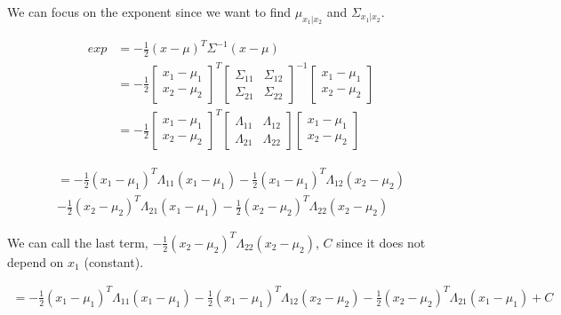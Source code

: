\documentclass{article}
\begin{document}
\begin{enumerate}[label=(\alph*)]
We can focus on the exponent since we want to find $\mu_{x_1|x_2}$ and $\Sigma_{x_1|x_2}$.


\begin{align*}
exp&=-\frac{1}{2}(x-\mu)^T\Sigma^{-1}(x-\mu) \\
&=-\frac{1}{2}
\begin{bmatrix}
  x_1 - \mu_1 \\ x_2 - \mu_2
\end{bmatrix}
^T
\begin{bmatrix}
  \Sigma_{11} & \Sigma_{12} \\ \Sigma_{21} & \Sigma_{22}
\end{bmatrix}
^{-1}
\begin{bmatrix}
  x_1 - \mu_1 \\ x_2 - \mu_2
\end{bmatrix} \\
&=-\frac{1}{2}
\begin{bmatrix}
  x_1 - \mu_1 \\ x_2 - \mu_2
\end{bmatrix}
^T
\begin{bmatrix}
  \Lambda_{11} & \Lambda_{12} \\ \Lambda_{21} & \Lambda_{22}
\end{bmatrix}
\begin{bmatrix}
  x_1 - \mu_1 \\ x_2 - \mu_2
\end{bmatrix}
\end{align*}

\begin{multline*}
=-\frac{1}{2}(x_1-\mu_1)^T\Lambda_{11}(x_1-\mu_1)
-\frac{1}{2}(x_1-\mu_1)^T\Lambda_{12}(x_2-\mu_2) \\
-\frac{1}{2}(x_2-\mu_2)^T\Lambda_{21}(x_1-\mu_1) 
-\frac{1}{2}(x_2-\mu_2)^T\Lambda_{22}(x_2-\mu_2)
\end{multline*}

We can call the last term, $-\frac{1}{2}(x_2-\mu_2)^T\Lambda_{22}(x_2-\mu_2)$, $C$ since it does not depend on $x_1$ (constant).

\begin{multline*}
=-\frac{1}{2}(x_1-\mu_1)^T\Lambda_{11}(x_1-\mu_1)
-\frac{1}{2}(x_1-\mu_1)^T\Lambda_{12}(x_2-\mu_2)
-\frac{1}{2}(x_2-\mu_2)^T\Lambda_{21}(x_1-\mu_1) 
+C
\end{multline*}


\end{enumerate}
\end{document}
